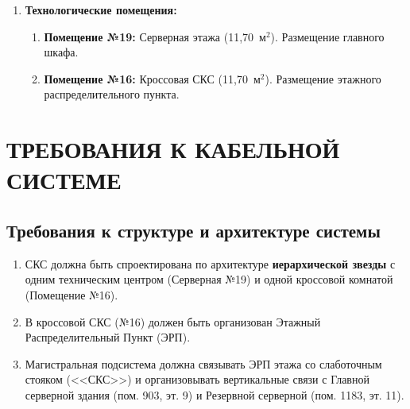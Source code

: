 \documentclass{bmstu}
\begin{document}
\begin{appendices}
\begin{enumerate}[label=\thesection.\arabic*]
    \item \textbf{Технологические помещения:}
    \begin{enumerate}[label=\thesection.\arabic{enumi}.\arabic*]
        \item \textbf{Помещение №19:} Серверная этажа (11,70~м$^2$). Размещение главного шкафа.
        \item \textbf{Помещение №16:} Кроссовая СКС (11,70~м$^2$). Размещение этажного распределительного пункта.
    \end{enumerate}
\end{enumerate}


\section{ТРЕБОВАНИЯ К КАБЕЛЬНОЙ СИСТЕМЕ}

\subsection{Требования к структуре и архитектуре системы}
\begin{enumerate}[label=\thesection.\arabic*]
    \item СКС должна быть спроектирована по архитектуре \textbf{иерархической звезды} с одним техническим центром (Серверная №19) и одной кроссовой комнатой (Помещение №16).
    \item В кроссовой СКС (№16) должен быть организован Этажный Распределительный Пункт (ЭРП).
    \item Магистральная подсистема должна связывать ЭРП этажа со слаботочным стояком (<<СКС>>) и организовывать вертикальные связи с Главной серверной здания (пом. 903, эт. 9) и Резервной серверной (пом. 1183, эт. 11).
\end{enumerate}


\end{appendices}
\end{document}
